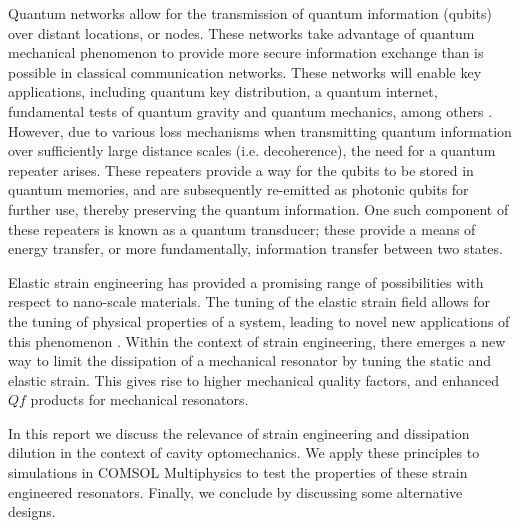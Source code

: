 \documentclass[%
 reprint,
nofootinbib,
 amsmath,amssymb,
 aps,
]{revtex4-2}
\begin{document}
Quantum networks allow for the transmission of quantum information (qubits) over distant locations, or nodes. These networks take advantage of quantum mechanical phenomenon to provide more secure information exchange than is possible in classical communication networks. These networks will enable key applications, including quantum key distribution, a quantum internet, fundamental tests of quantum gravity and quantum mechanics, among others \cite{project_paper}. However, due to various loss mechanisms when transmitting quantum information over sufficiently large distance scales (i.e. decoherence), the need for a quantum repeater arises. These repeaters provide a way for the qubits to be stored in quantum memories, and are subsequently re-emitted as photonic qubits for further use, thereby preserving the quantum information. One such component of these repeaters is known as a quantum transducer; these provide a means of energy transfer, or more fundamentally, information transfer between two states. 
\newline 

Elastic strain engineering has provided a promising range of possibilities with respect to nano-scale materials. The tuning of the elastic strain field allows for the tuning of physical properties of a system, leading to novel new applications of this phenomenon \cite{elastic_strain_engineering}. Within the context of strain engineering, there emerges a new way to limit the dissipation of a mechanical resonator by tuning the static and elastic strain. This gives rise to higher mechanical quality factors, and enhanced $Qf$ products for mechanical resonators.
\newline

In this report we discuss the relevance of strain engineering and dissipation dilution in the context of cavity optomechanics. We apply these principles to simulations in COMSOL Multiphysics to test the properties of these strain engineered resonators. Finally, we conclude by discussing some alternative designs.





\end{document}
